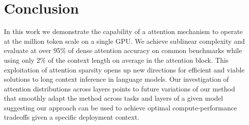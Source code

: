 \section{Conclusion}
\label{conclusion}

In this work we demonstrate the capability of a \topk attention mechanism to operate at the million token scale on a single GPU. We achieve sublinear complexity and evaluate at over 95\% of dense attention accuracy on common benchmarks while using only 2\% of the context length on average in the attention block. This exploitation of attention sparsity opens up new directions for efficient and viable solutions to long context inference in language models. Our investigation of attention distributions across layers points to future variations of our method that smoothly adapt the \topk method across tasks and layers of a given model suggesting our \topk approach can be used to achieve optimal compute-performance tradeoffs given a specific deployment context.


